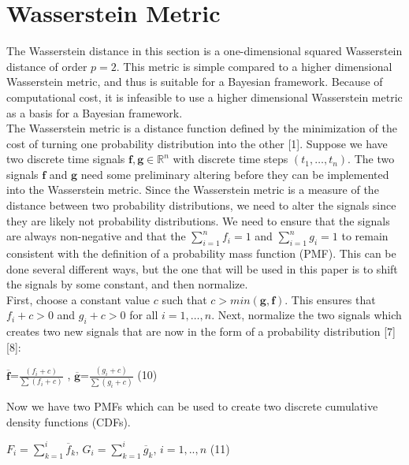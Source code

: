 \documentclass[botnum, fleqn]{unmeethesis}
\begin{document}
\section{\label{section:Wasserstein Metric}Wasserstein Metric}
The Wasserstein distance in this section is a one-dimensional squared Wasserstein distance of order $p=2$. This metric is simple compared to a higher dimensional Wasserstein metric, and thus is suitable for a Bayesian framework. Because of computational cost, it is infeasible to use a higher dimensional Wasserstein metric as a basis for a Bayesian framework.\\The Wasserstein metric is a distance function defined by the minimization of the cost of turning one probability distribution into the other [1]. Suppose we have two discrete time signals $\bm{f},\bm{g} \in \mathbb{R}^n$ with discrete time steps $(t_1,…,t_n)$. The two signals $\bm{f}$ and $\bm{g}$ need some preliminary altering before they can be implemented into the Wasserstein metric. Since the Wasserstein metric is a measure of the distance between two probability distributions, we need to alter the signals since they are likely not probability distributions. We need to ensure that the signals are always non-negative and that the $\sum_{i=1}^{n}f_i=1$ and $\sum_{i=1}^{n}g_i=1$ to remain consistent with the definition of a probability mass function (PMF). This can be done several different ways, but the one that will be used in this paper is to shift the signals by some constant, and then normalize. \\
First, choose a constant value $c$ such that $c>min(\bm{g},\bm{f})$. This ensures that $f_i+c>0$ and $g_i+c>0$ for all $i=1,…,n$. Next, normalize the two signals which creates two new signals that are now in the form of a probability distribution [7][8]:

\hspace{\fill}$\overline{\bm{f}}$=\Large$\frac{(f_i+c)}{\sum(f_i+c)}$ \normalsize, \hspace{1cm} $\overline{\bm{g}}$=\Large$\frac{(g_i+c)}{\sum(g_i+c)}$\hspace{\fill} \normalsize (10)

Now we have two PMFs which can be used to create two discrete cumulative density functions (CDFs). 

\hspace{\fill}$F_i=\sum_{k=1}^{i}\overline{f}_k$, \hspace{1cm} $G_i=\sum_{k=1}^{i}\overline{g}_k$, \hspace{1cm}  $i=1,..,n$\hspace{\fill} \normalsize (11)
\end{document}
